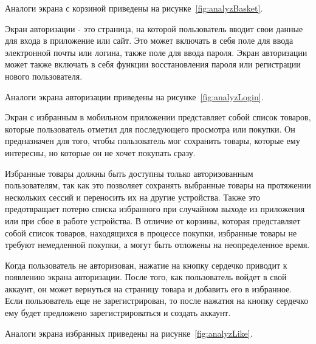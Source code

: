 Аналоги экрана с корзиной приведены на рисунке~\ref{fig:analyzBasket}.

Экран авторизации - это страница, на которой пользователь вводит свои данные для входа
в приложение или сайт.
Это может включать в себя поле для ввода электронной почты или логина, 
 также поле для ввода пароля.
Экран авторизации может также включать в себя функции восстановления пароля
или регистрации нового пользователя. 

Аналоги экрана авторизации приведены на рисунке~\ref{fig:analyzLogin}.

Экран с избранным в мобильном приложении представляет собой список товаров,
которые пользователь отметил для последующего просмотра или покупки.
Он предназначен для того, чтобы пользователь мог сохранить товары, которые ему интересны,
но которые он не хочет покупать сразу.

Избранные товары должны быть доступны только авторизованным пользователям,
так как это позволяет сохранять выбранные товары на протяжении нескольких сессий
и переносить их на другие устройства.
Также это предотвращает потерю списка избранного при случайном выходе из приложения
или при сбое в работе устройства.
В отличие от корзины, которая представляет собой список товаров, находящихся в процессе покупки,
избранные товары не требуют немедленной покупки,
а могут быть отложены на неопределенное время.

Когда пользователь не авторизован, нажатие на кнопку сердечко приводит к появлению экрана авторизации.
После того, как пользователь войдет в свой аккаунт,
он может вернуться на страницу товара и добавить его в избранное.
Если пользователь еще не зарегистрирован,
то после нажатия на кнопку сердечко ему будет предложено зарегистрироваться и создать аккаунт.

Аналоги экрана избранных приведены на рисунке~\ref{fig:analyzLike}.


